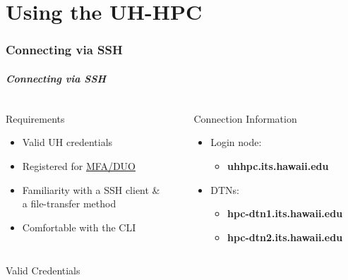 \part{Using the UH-HPC}
\begin{frame}
			 \partpage
\end{frame}


\section[Connecting via SSH]{Connecting via SSH}
\begin{frame}
\frametitle{Connecting via SSH}
\begin{columns}
	\begin{column}{0.46\textwidth}
		\begin{block}{Requirements}
			\begin{itemize}
				\item Valid UH credentials 
				\item Registered for \href{http://www.hawaii.edu/its/uhlogin/}{MFA/DUO}
				\item Familiarity with a SSH client \&\\a file-transfer method
				\item Comfortable with the CLI
			\end{itemize}
                        \end{block}
	\end{column}
	\begin{column}{0.46\textwidth}
		\begin{block}{Connection Information}\
	\begin{itemize}
		\item Login node: 
		  \begin{itemize} 
		  \item \textbf{uhhpc.its.hawaii.edu}
		  \end{itemize}
		\item DTNs:
		  \begin{itemize} 
		  \item \textbf{hpc-dtn1.its.hawaii.edu}
		  \item \textbf{hpc-dtn2.its.hawaii.edu}
		  \end{itemize}
	\end{itemize}
        \end{block}
	        \end{column}                
	\end{columns}
	\begin{block}{Valid Credentials}\footnotesize

\end{block}
\end{frame}
